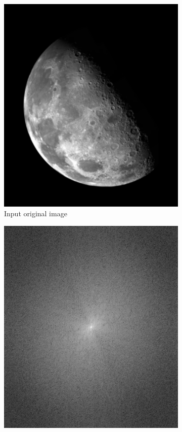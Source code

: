 \documentclass[UTF8]{ctexart}
\begin{document}
\begin{figure}[htbp]
    \vspace{0.5cm}
    \centering
    \begin{subfigure}{0.3\textwidth}
        \centering
        \includegraphics[width=\linewidth]{blurry_moon.png}
        \caption{Input original image}
    \end{subfigure}%
    \hfill
    \begin{subfigure}{0.3\textwidth}
        \centering
        \includegraphics[width=\linewidth]{blurry_moon_spectrum.png}

\end{subfigure}
\end{figure}
\end{document}
